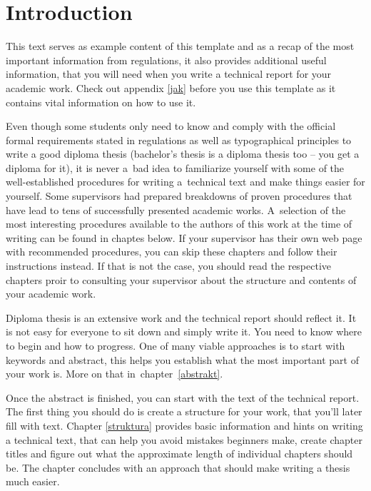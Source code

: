 
\chapter{Introduction}

This text serves as example content of this template and as a recap of the most important information from regulations, it also provides additional useful information, that you will need when you write a technical report for your academic work. Check out appendix \ref{jak} before you use this template as it contains vital information on how to use it.

Even though some students only need to know and comply with the official formal requirements stated in regulations as well as typographical principles to write a good diploma thesis (bachelor's thesis is a diploma thesis too -- you get a diploma for it), it is never a~bad idea to familiarize yourself with some of the well-established procedures for writing a~technical text and make things easier for yourself. Some supervisors had prepared breakdowns of proven procedures that have lead to tens of successfully presented academic works. A~selection of the most interesting procedures available to the authors of this work at the time of writing can be found in chaptes below. If your supervisor has their own web page with recommended procedures, you can skip these chapters and follow their instructions instead. If that is not the case, you should read the respective chapters proir to consulting your supervisor about the structure and contents of your academic work.

Diploma thesis is an extensive work and the technical report should reflect it. It is not easy for everyone to sit down and simply write it. You need to know where to begin and how to progress. One of many viable approaches is to start with keywords and abstract, this helps you establish what the most important part of your work is. More on that in~chapter~\ref{abstrakt}.

Once the abstract is finished, you can start with the text of the technical report. The first thing you should do is create a structure for your work, that you'll later fill with text. Chapter \ref{struktura} provides basic information and hints on writing a technical text, that can help you avoid mistakes beginners make, create chapter titles and figure out what the approximate length of individual chapters should be. The chapter concludes with an approach that should make writing a thesis much easier.

